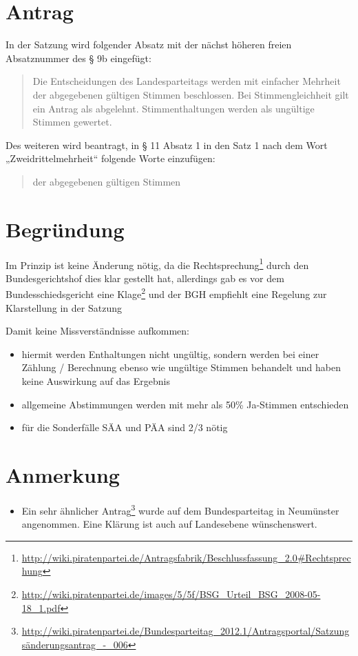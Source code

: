 \section{Antrag}

In der Satzung wird folgender Absatz mit der nächst höheren freien Absatznummer des § 9b eingefügt:

\begin{quote}
Die Entscheidungen des Landesparteitags werden mit einfacher Mehrheit der abgegebenen gültigen Stimmen beschlossen. Bei Stimmengleichheit gilt ein Antrag als abgelehnt. Stimmenthaltungen werden als ungültige Stimmen gewertet.

\end{quote}
Des weiteren wird beantragt, in § 11 Absatz 1 in den Satz 1 nach dem Wort „Zweidrittelmehrheit`` folgende Worte einzufügen:

\begin{quote}
der abgegebenen gültigen Stimmen

\end{quote}
\section{Begründung}

Im Prinzip ist keine Änderung nötig, da die Rechtsprechung\footnote{\url{http://wiki.piratenpartei.de/Antragsfabrik/Beschlussfassung\_2.0\#Rechtsprechung}} durch den Bundesgerichtshof dies klar gestellt hat, allerdings gab es vor dem Bundesschiedsgericht eine Klage\footnote{\url{http://wiki.piratenpartei.de/images/5/5f/BSG\_Urteil\_BSG\_2008-05-18\_1.pdf}} und der BGH empfiehlt eine Regelung zur Klarstellung in der Satzung

Damit keine Missverständnisse aufkommen:

\begin{itemize}
\item
  hiermit werden Enthaltungen nicht ungültig, sondern werden bei einer Zählung / Berechnung ebenso wie ungültige Stimmen behandelt und haben keine Auswirkung auf das Ergebnis
\item
  allgemeine Abstimmungen werden mit mehr als 50\% Ja-Stimmen entschieden
\item
  für die Sonderfälle SÄA und PÄA sind 2/3 nötig
\end{itemize}
\section{Anmerkung}

\begin{itemize}
\item
  Ein sehr ähnlicher Antrag\footnote{\url{http://wiki.piratenpartei.de/Bundesparteitag\_2012.1/Antragsportal/Satzungsänderungsantrag\_-\_006}} wurde auf dem Bundesparteitag in Neumünster angenommen. Eine Klärung ist auch auf Landesebene wünschenswert.
\end{itemize}
